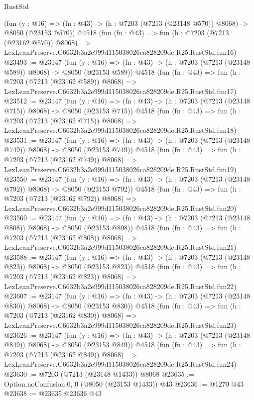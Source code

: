 \begin{lexlean}{RustStd}
\begin{coremodule}
    (fun (y : @16) => (fn : @43) -> (h : @7203 (@7213 (@23148 @570)) @8068) -> @8050 (@23153 @570))
    @4518
    (fun (fn : @43) =>
    fun (h : @7203 (@7213 (@23162 @570)) @8068) =>
    LexLeanPreserve.C6632b3a2e999d115038026ca828209de.R25.RustStd.fun16)
@23493 := @23147
    (fun (y : @16) => (fn : @43) -> (h : @7203 (@7213 (@23148 @589)) @8068) -> @8050 (@23153 @589))
    @4518
    (fun (fn : @43) =>
    fun (h : @7203 (@7213 (@23162 @589)) @8068) =>
    LexLeanPreserve.C6632b3a2e999d115038026ca828209de.R25.RustStd.fun17)
@23512 := @23147
    (fun (y : @16) => (fn : @43) -> (h : @7203 (@7213 (@23148 @715)) @8068) -> @8050 (@23153 @715))
    @4518
    (fun (fn : @43) =>
    fun (h : @7203 (@7213 (@23162 @715)) @8068) =>
    LexLeanPreserve.C6632b3a2e999d115038026ca828209de.R25.RustStd.fun18)
@23531 := @23147
    (fun (y : @16) => (fn : @43) -> (h : @7203 (@7213 (@23148 @749)) @8068) -> @8050 (@23153 @749))
    @4518
    (fun (fn : @43) =>
    fun (h : @7203 (@7213 (@23162 @749)) @8068) =>
    LexLeanPreserve.C6632b3a2e999d115038026ca828209de.R25.RustStd.fun19)
@23550 := @23147
    (fun (y : @16) => (fn : @43) -> (h : @7203 (@7213 (@23148 @792)) @8068) -> @8050 (@23153 @792))
    @4518
    (fun (fn : @43) =>
    fun (h : @7203 (@7213 (@23162 @792)) @8068) =>
    LexLeanPreserve.C6632b3a2e999d115038026ca828209de.R25.RustStd.fun20)
@23569 := @23147
    (fun (y : @16) => (fn : @43) -> (h : @7203 (@7213 (@23148 @808)) @8068) -> @8050 (@23153 @808))
    @4518
    (fun (fn : @43) =>
    fun (h : @7203 (@7213 (@23162 @808)) @8068) =>
    LexLeanPreserve.C6632b3a2e999d115038026ca828209de.R25.RustStd.fun21)
@23588 := @23147
    (fun (y : @16) => (fn : @43) -> (h : @7203 (@7213 (@23148 @823)) @8068) -> @8050 (@23153 @823))
    @4518
    (fun (fn : @43) =>
    fun (h : @7203 (@7213 (@23162 @823)) @8068) =>
    LexLeanPreserve.C6632b3a2e999d115038026ca828209de.R25.RustStd.fun22)
@23607 := @23147
    (fun (y : @16) => (fn : @43) -> (h : @7203 (@7213 (@23148 @830)) @8068) -> @8050 (@23153 @830))
    @4518
    (fun (fn : @43) =>
    fun (h : @7203 (@7213 (@23162 @830)) @8068) =>
    LexLeanPreserve.C6632b3a2e999d115038026ca828209de.R25.RustStd.fun23)
@23626 := @23147
    (fun (y : @16) => (fn : @43) -> (h : @7203 (@7213 (@23148 @849)) @8068) -> @8050 (@23153 @849))
    @4518
    (fun (fn : @43) =>
    fun (h : @7203 (@7213 (@23162 @849)) @8068) =>
    LexLeanPreserve.C6632b3a2e999d115038026ca828209de.R25.RustStd.fun24)
@23630 := @7203 (@7213 (@23148 @1433)) @8068
@23635 := Option.noConfusion.{0, 0} (@8050 (@23153 @1433)) @43
@23636 := @1270 @43
@23638 := @23635 @23636 @43

\end{coremodule}
\end{lexlean}
